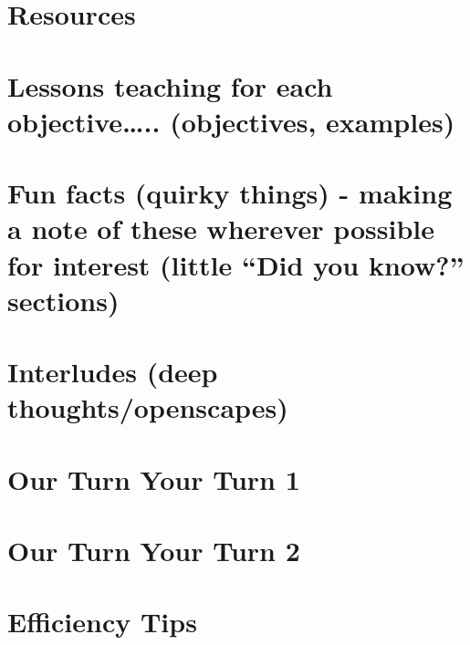 \documentclass[]{book}
\begin{document}
\hypertarget{resources-7}{%
\section{Resources}\label{resources-7}}

\hypertarget{lessons-teaching-for-each-objective..-objectives-examples-3}{%
\section{Lessons teaching for each objective\ldots{}.. (objectives, examples)}\label{lessons-teaching-for-each-objective..-objectives-examples-3}}

\hypertarget{fun-facts-quirky-things---making-a-note-of-these-wherever-possible-for-interest-little-did-you-know-sections-3}{%
\section{Fun facts (quirky things) - making a note of these wherever possible for interest (little ``Did you know?'' sections)}\label{fun-facts-quirky-things---making-a-note-of-these-wherever-possible-for-interest-little-did-you-know-sections-3}}

\hypertarget{interludes-deep-thoughtsopenscapes-6}{%
\section{Interludes (deep thoughts/openscapes)}\label{interludes-deep-thoughtsopenscapes-6}}

\hypertarget{our-turn-your-turn-1-3}{%
\section{Our Turn Your Turn 1}\label{our-turn-your-turn-1-3}}

\hypertarget{our-turn-your-turn-2-4}{%
\section{Our Turn Your Turn 2}\label{our-turn-your-turn-2-4}}

\hypertarget{efficiency-tips-7}{%
\section{Efficiency Tips}\label{efficiency-tips-7}}


\end{document}
